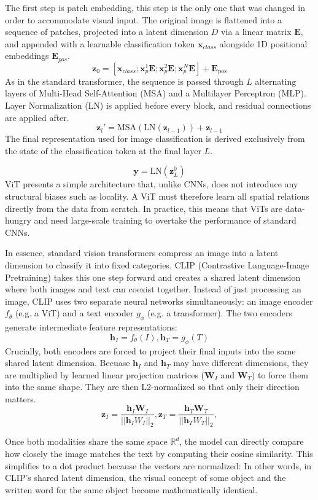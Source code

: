 \begin{easylist}
The first step is patch embedding, this step is the only one that was changed in order to accommodate visual input. The original image is flattened into a sequence of patches, projected into a latent dimension $D$ via a linear matrix $\mathbf{E}$, and appended with a learnable classification token $\mathbf{x}_{class}$ alongside 1D positional embeddings $\mathbf{E}_{pos}$. 
$$\mathbf{z}_{0} = [\mathbf{x}_{class}; \mathbf{x}_{p}^{1}\mathbf{E};\mathbf{x}_{p}^{2}\mathbf{E};\mathbf{x}_{p}^{N}\mathbf{E}]+\mathbf{E}_{\text{pos}}$$
As in the standard transformer, the sequence is passed through $L$ alternating layers of Multi-Head Self-Attention (MSA) and a Multilayer Perceptron (MLP). Layer Normalization (LN) is applied before every block, and residual connections are applied after. 
$$\mathbf{z}_{l}' = \text{MSA}(\text{LN}(\mathbf{z}_{l-1})) + \mathbf{z}_{l-1}$$
The final representation used for image classification is derived exclusively from the state of the classification token at the final layer $L$. 

$$\mathbf{y} = \text{LN}(\mathbf{z}_{L}^{0})$$
ViT presents a simple architecture that, unlike CNNs, does not introduce any structural biases such as locality. A ViT must therefore learn all spatial relations directly from the data from scratch. In practice, this means that ViTs are data-hungry and need large-scale training to overtake the performance of standard CNNs.

In essence, standard vision transformers compress an image into a latent dimension to classify it into fixed categories. CLIP (Contrastive Language-Image Pretraining) takes this one step forward and creates a shared latent dimension where both images and text can coexist together. Instead of just processing an image, CLIP uses two separate neural networks simultaneously: an image encoder $f_{\theta}$ (e.g. a ViT) and a text encoder $g_{\phi}$ (e.g. a transformer). The two encoders generate intermediate feature representations: 
$$\mathbf{h}_{I} = f_{\theta}(I), \mathbf{h}_{T} = g_{\phi}(T) $$Crucially, both encoders are forced to project their final inputs into the same shared latent dimension. Becuase $\mathbf{h}_{I}$ and $\mathbf{h}_{T}$ may have different dimensions, they are multiplied by learned linear projection matrices ($\mathbf{W}_{I}$ and $\mathbf{W}_{T}$) to force them into the same shape. They are then L2-normalized so that only their direction matters. $$\mathbf{z}_{I} = \frac{\mathbf{h}_{I}\mathbf{W}_{I}}{||\mathbf{h}_{I}W_{I}||_{2}}, \mathbf{z}_{T} = \frac{\mathbf{h}_{T}\mathbf{W}_{T}}{||\mathbf{h}_{T}W_{T}||_{2}},$$

Once both modalities share the same space $\mathbb{R}^d$, the model can directly compare how closely the image matches the text by computing their cosine similarity. This simplifies to a dot product because the vectors are normalized:
In other words, in CLIP's shared latent dimension, the visual concept of some object and the written word for the same object become mathematically identical. 

\end{easylist}

